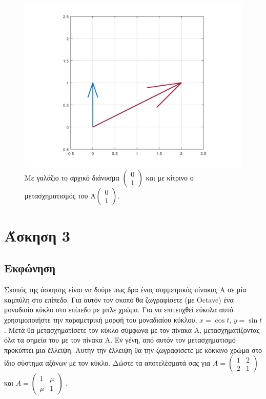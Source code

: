 \documentclass[a4paper,12pt]{article}
\begin{document}
\begin{figure}
    \centering
    \includegraphics[scale=0.7]{x2.png}
    \caption{Με γαλάζιο το αρχικό διάνυσμα
        $
            \begin{pmatrix}
                0 \\
                1
            \end{pmatrix}
        $
        και με κίτρινο ο μετασχηματισμός του
        $
            \text{A} \begin{pmatrix}
                0 \\
                1
            \end{pmatrix}
        $.}
\end{figure}
\newpage\section{Άσκηση 3}
\subsection{Εκφώνηση}
Σκοπός της άσκησης είναι να δούμε πως δρα ένας συμμετρικός πίνακας Α σε μία καμπύλη στο επίπεδο.
Για αυτόν τον σκοπό θα ζωγραφίσετε (με Octave) ένα μοναδιαίο κύκλο στο επίπεδο με μπλε χρώμα.
Για να επιτευχθεί εύκολα αυτό χρησιμοποιήστε την παραμετρική μορφή του μοναδιαίου κύκλου, $x=\cos{t}$,
$y=\sin{t}$. Μετά θα μετασχηματίσετε τον κύκλο σύμφωνα με τον πίνακα Α, μετασχηματίζοντας όλα τα σημεία
του με τον πίνακα Α. Εν γένη, από αυτόν τον μετασχηματισμό προκύπτει μια έλλειψη. Αυτήν την έλλειψη θα την
ζωγραφίσετε με κόκκινο χρώμα στο ίδιο σύστημα αξόνων με τον κύκλο. Δώστε τα αποτελέσματά σας για
$
    A=\begin{pmatrix}
        1 & 2 \\
        2 & 1
    \end{pmatrix}
$
και
$
    A=\begin{pmatrix}
        1   & \mu \\
        \mu & 1
    \end{pmatrix}
$
.
\end{document}

